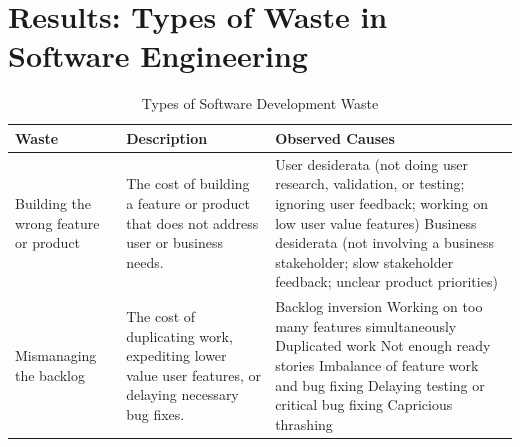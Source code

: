 \section{Results: Types of Waste in Software Engineering}
\label{SEWaste}

\begin{table}[t]
\renewcommand{\arraystretch}{1.3}
\centering
\caption{Types of Software Development Waste}
\label{Waste}
\begin{tabular}{|p{1.5in}|p{1.9in}|p{3.2in}|}
\hline
Waste  & Description & Observed Causes                                                                                                                                                                                                                                                                                                                                                                                                                     \\ \hline
Building the wrong feature or product &  The cost of building a feature or product that does not address user or business needs. & 
User desiderata (not doing user research, validation, or testing; ignoring user feedback; working on low user value features) \newline 
Business desiderata (not involving a business stakeholder; slow stakeholder feedback; unclear product priorities)                                                                                                                                                                                  \\ \hline
Mismanaging the backlog     & The cost of duplicating work, expediting lower value user features, or delaying necessary bug fixes.  & 
Backlog inversion \newline Working on too many features simultaneously \newline Duplicated work \newline Not enough ready stories  \newline Imbalance of feature work and bug fixing \newline Delaying testing or critical bug fixing \newline Capricious thrashing                                                                                                                                                                                                                                                                                                                                    \\ \hline

\end{tabular}
\end{table}
